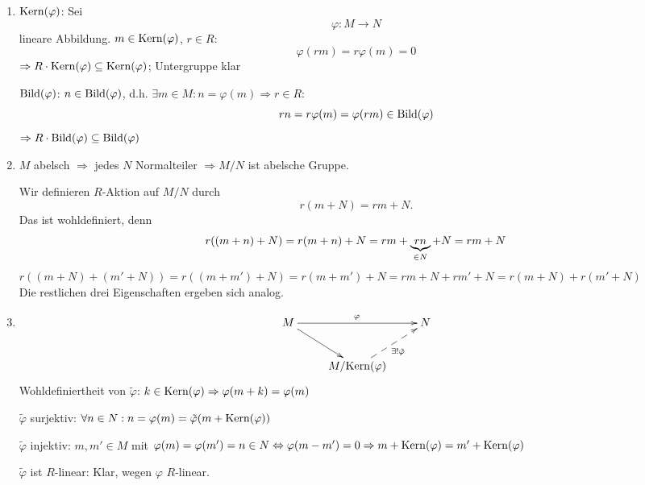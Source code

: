 \documentclass[a4paper, 10pt]{report}
\begin{document}
\begin{Bew}
\begin{enumerate}
\item $\mathrm{Kern}(\varphi)$: Sei 
\[
\varphi: M \to N
\]
 lineare Abbildung. $m \in \mathrm{Kern}(\varphi)$, $r \in R$:
\[
\varphi(rm) = r\varphi(m) = 0
\] 
$\Rightarrow R \cdot \mathrm{Kern}(\varphi) \subseteq \mathrm{Kern}(\varphi)$; Untergruppe klar

$\mathrm{Bild}(\varphi)$: $n \in \mathrm{Bild}(\varphi)$, d.h. $\exists m\in M: n =
\varphi (m) \Rightarrow r \in R:$
\[
rn = r \varphi(m) = \varphi(rm) \in \mathrm{Bild}(\varphi)
\]
$\Rightarrow R
\cdot \mathrm{Bild}(\varphi) \subseteq \mathrm{Bild}(\varphi)$
\item $M$ abelsch $\Rightarrow$ jedes $N$ Normalteiler $\Rightarrow M/N$ ist
abelsche Gruppe.

Wir definieren $R$-Aktion auf $M/N$ durch
\[
r(m + N) = rm + N.
\]
Das ist wohldefiniert, denn
\[
r((m+n)+N)=r(m+n) + N= rm + \underbrace{rn}_{\in N} + N = rm + N
\]
$r((m+N) + (m' + N ) ) = r((m+m')+N) = r(m+m') + N = rm + N + rm' + N =
r(m+N) + r(m'+N)$\\
Die restlichen drei Eigenschaften ergeben sich analog.
  
\item
$$\begin{xy}
\xymatrix{
M \ar[rr]^{\varphi} \ar[rd] &     &  N \\
&  M/\K{\varphi} \ar@{-->}[ur]_{\exists!\tilde{\varphi}}  & }
\end{xy}$$
Wohldefiniertheit von $\tilde{\varphi}$:
$k \in \mathrm{Kern}(\varphi)\Rightarrow \varphi(m+k) = \varphi(m)$

$\tilde{\varphi}$ surjektiv: $\forall n \in N: n = \varphi(m) =
\tilde{\varphi}(m+ \mathrm{Kern}(\varphi))$

$\tilde{\varphi}$ injektiv: $m, m' \in M$ mit $\varphi(m) = \varphi(m') = n
\in N \Leftrightarrow 
\varphi(m-m') = 0 \Rightarrow m + \mathrm{Kern}(\varphi) = 
m' + \mathrm{Kern}(\varphi)$

$\tilde{\varphi}$ ist $R$-linear: Klar, wegen $\varphi$ $R$-linear.
\end{enumerate}
\end{Bew}
\end{document}
